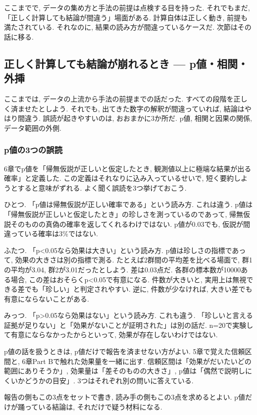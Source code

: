 ここまでで, データの集め方と手法の前提は点検する目を持った.
それでもまだ, 「正しく計算しても結論が間違う」場面がある.
計算自体は正しく動き, 前提も満たされている. それなのに, 結果の読み方が間違っているケースだ.
次節はその話に移る.


\subsection{正しく計算しても結論が崩れるとき — p値・相関・外挿}

ここまでは, データの上流から手法の前提までの話だった.
すべての段階を正しく済ませたとしよう.
それでも, 出てきた数字の解釈が間違っていれば, 結論はやはり間違う.
誤読が起きやすいのは, おおまかに3か所だ. p値, 相関と因果の関係, データ範囲の外側.

\subsubsection*{p値の3つの誤読}

6章でp値を「帰無仮説が正しいと仮定したとき, 観測値以上に極端な結果が出る確率」と定義した.
この定義はそれなりに込み入っているせいで, 短く要約しようとすると意味がずれる.
よく聞く誤読を3つ挙げておこう.

ひとつ. 「p値は帰無仮説が正しい確率である」という読み方.
これは違う. p値は「帰無仮説が正しいと仮定したとき」の珍しさを測っているのであって, 帰無仮説そのものの真偽の確率を返してくれるわけではない.
p値が0.03でも, 仮説が間違っている確率は3\%ではない.

ふたつ. 「p<0.05なら効果は大きい」という読み方.
p値は珍しさの指標であって, 効果の大きさは別の指標で測る.
たとえば2群間の平均差を比べる場面で, 群1の平均が3.04, 群2が3.01だったとしよう.
差は0.03点だ. 各群の標本数が10000ある場合, この差はおそらくp<0.05で有意になる.
件数が大きいと, 実用上は無視できる差でも「珍しい」と判定されやすい.
逆に, 件数が少なければ, 大きい差でも有意にならないことがある.

みっつ. 「p>0.05なら効果はない」という読み方.
これも違う. 「珍しいと言える証拠が足りない」と「効果がないことが証明された」は別の話だ.
n=20で実験して有意にならなかったからといって, 効果が存在しないわけではない.

p値の話を扱うときは, p値だけで報告を済ませない方がよい.
5章で覚えた信頼区間と, 6章Part Bで触れた効果量を一緒に出す.
信頼区間は「効果がだいたいどの範囲にありそうか」, 効果量は「差そのものの大きさ」, p値は「偶然で説明しにくいかどうかの目安」.
3つはそれぞれ別の問いに答えている.

報告の側もこの3点をセットで書き, 読み手の側もこの3点を求めるとよい.
p値だけが踊っている結論は, それだけで疑う材料になる.


